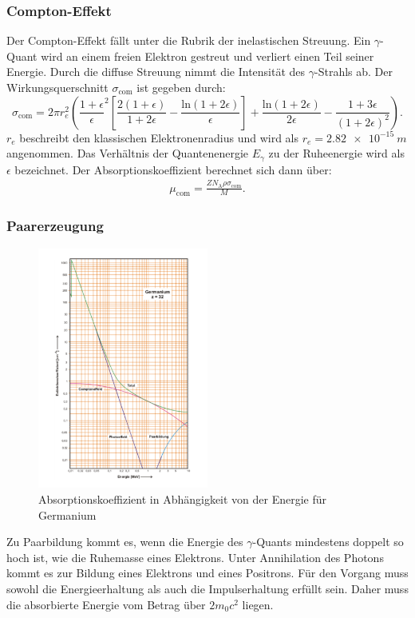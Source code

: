 \subsubsection{Compton-Effekt}
Der Compton-Effekt fällt unter die Rubrik der inelastischen Streuung. Ein $\gamma$-Quant wird an einem freien Elektron gestreut und verliert einen Teil seiner Energie.
Durch die diffuse Streuung nimmt die Intensität des $\gamma$-Strahls ab. Der Wirkungsquerschnitt $\sigma_{\text{com}}$ ist gegeben durch:
\begin{equation}
  \sigma_{\text{com}}=2\pi r^2_e\left(\frac{1+\epsilon}{\epsilon}^2\left[\frac{2(1+\epsilon)}{1+2\epsilon}-\frac{\text{ln}(1+2\epsilon)}{\epsilon}\right]+\frac{\text{ln}(1+2\epsilon)}{2\epsilon}-\frac{1+3\epsilon}{(1+2\epsilon)^2}\right).
\label{eqn:sigma}
\end{equation}
$r_e$ beschreibt den klassischen Elektronenradius und wird als $r_e=\SI{2,82e-15}{m}$ angenommen. Das Verhältnis der Quantenenergie $E_\gamma$ zu der Ruheenergie wird als $\epsilon$ bezeichnet.
Der Absorptionskoeffizient berechnet sich dann über:
\begin{align}
  \mu_{\text{com}}= \frac{Z N_{\text{A}} \rho \sigma_{\text{com}}}{M}.
  \label{eqn:koeff}
\end{align}
\subsubsection{Paarerzeugung}
\begin{figure}[h!]
  \centering
  \includegraphics[width=0.5\textwidth]{abbs.pdf}
  \caption{Absorptionskoeffizient in Abhängigkeit von der Energie für Germanium \cite{1}}
  \label{fig:abbs}
\end{figure}
Zu Paarbildung kommt es, wenn die Energie des $\gamma$-Quants mindestens doppelt so hoch
ist, wie die Ruhemasse eines Elektrons. Unter Annihilation des Photons kommt es zur Bildung eines Elektrons und eines Positrons.
Für den Vorgang muss sowohl die Energieerhaltung als auch die Impulserhaltung erfüllt sein. Daher muss die absorbierte Energie vom Betrag über $2m_0c^2$ liegen.\\

